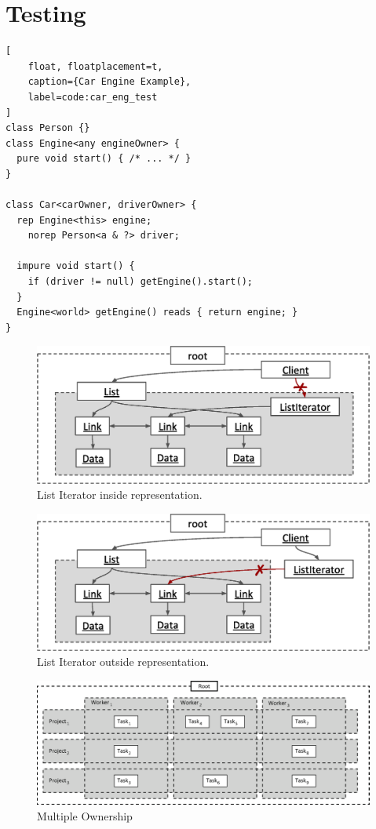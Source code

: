\documentclass{acm_proc_article-sp}
\begin{document}
\section{Testing}
\label{sec:test}

\begin{lstlisting}[
	float, floatplacement=t,
	caption={Car Engine Example},
	label=code:car_eng_test
]
class Person {}
class Engine<any engineOwner> {
  pure void start() { /* ... */ }
}

class Car<carOwner, driverOwner> {
  rep Engine<this> engine;
	norep Person<a & ?> driver;

  impure void start() {
    if (driver != null) getEngine().start();
  }
  Engine<world> getEngine() reads { return engine; }
}
\end{lstlisting}

\begin{figure}[t]
\centering
\includegraphics{iterator-fail-inside.eps}
\caption{List Iterator inside representation.}
\label{fig:iterator-inside-test}
\end{figure}

\begin{figure}[t]
\centering
\includegraphics{iterator-fail-outside.eps}
\caption{List Iterator outside representation.}
\label{fig:iterator-outside-test}
\end{figure}

\begin{figure}[t]
\centering
\includegraphics{multiple-ownership.eps}
\caption{Multiple Ownership}
\label{fig:multiple-ownership}
\end{figure}
\end{document}
